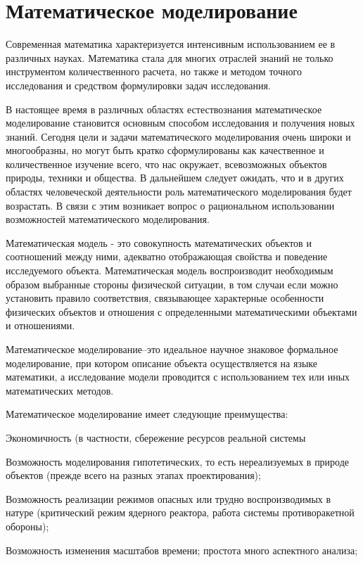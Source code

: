 \section{Математическое моделирование }

Современная математика характеризуется интенсивным использованием ее в различных науках. Математика стала для многих отраслей знаний не только инструментом количественного расчета, но также и методом точного исследования и средством формулировки задач исследования.


В настоящее время в различных областях естествознания математическое моделирование становится основным способом исследования и получения новых знаний. Сегодня цели и задачи математического моделирования очень широки и многообразны, но могут быть кратко сформулированы как качественное и количественное изучение всего, что нас окружает, всевозможных объектов природы, техники и общества. В дальнейшем следует ожидать, что и в других областях человеческой деятельности роль математического моделирования будет возрастать. В связи с этим возникает вопрос о рациональном использовании возможностей математического моделирования.


Математическая модель - это совокупность математических объектов и соотношений между ними, адекватно отображающая свойства и поведение исследуемого объекта. Математическая модель воспроизводит необходимым образом выбранные стороны физической ситуации, в том случаи если можно установить правило соответствия, связывающее характерные особенности физических объектов и отношения с определенными математическими объектами и отношениями.


Математическое моделирование–это идеальное научное знаковое формальное моделирование, при котором описание объекта осуществляется на языке математики, а исследование модели проводится с использованием тех или иных математических методов. 


Математическое моделирование имеет следующие преимущества:


Экономичность (в частности, сбережение ресурсов реальной системы


Возможность моделирования гипотетических, то есть нереализуемых в природе объектов (прежде всего на разных этапах проектирования);


Возможность реализации режимов опасных или трудно воспроизводимых в натуре (критический режим ядерного реактора, работа системы противоракетной обороны);


Возможность изменения масштабов времени; простота много аспектного анализа;


